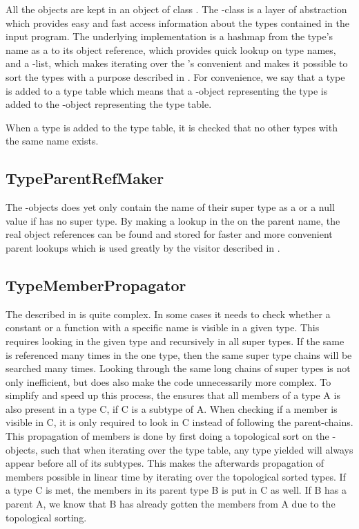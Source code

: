 All the  objects are kept in an object of class . The -class is a layer of abstraction which provides easy and fast access information about the types contained in the input program. The underlying implementation is a hashmap from the type's name as a  to its object reference, which provides quick lookup on type names, and a -list, which makes iterating over the 's convenient and makes it possible to sort the types with a purpose described in . For convenience, we say that a type is added to a type table which means that a -object representing the type is added to the -object representing the type table.

When a type is added to the type table, it is checked that no other types with the same name exists.

\subsection{TypeParentRefMaker}
\label{sec:TypeParentRefMaker}
The -objects does yet only contain the name of their super type as a  or a null value if has no super type. By making a lookup in the  on the parent name, the real object references can be found and stored for faster and more convenient parent lookups which is used greatly by the visitor described in .

\subsection{TypeMemberPropagator}
\label{sec:TypeMemberPropagator}
The  described in  is quite complex. In some cases it needs to check whether a constant or a function with a specific name is visible in a given type. This requires looking in the given type and recursively in all super types. If the same is referenced many times in the one type, then the same super type chains will be searched many times. Looking through the same long chains of super types is not only inefficient, but does also make the code unnecessarily more complex. To simplify and speed up this process, the  ensures that all members of a type A is also present in a type C, if C is a subtype of A. When checking if a member is visible in C, it is only required to look in C instead of following the parent-chains. This propagation of members is done by first doing a topological sort on the -objects, such that when iterating over the type table, any type yielded will always appear before all of its subtypes. This makes the afterwards propagation of members possible in linear time by iterating over the topological sorted types. If a type C is met, the members in its parent type B is put in C as well. If B has a parent A, we know that B has already gotten the members from A due to the topological sorting.

